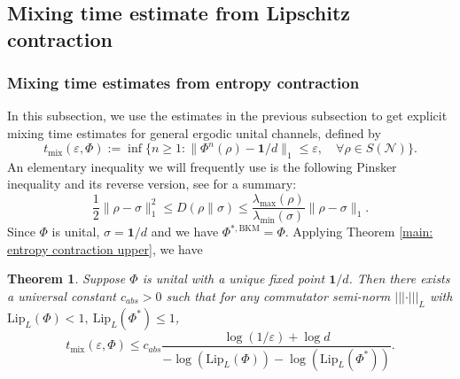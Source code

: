 \documentclass[11pt,reqno]{amsart}
\numberwithin{equation}{section}
\newtheorem{theorem}[lemma]{Theorem}
\newcommand{\mc}{\mathcal}
\newcommand{\Lip}{\mathrm{Lip}}
\begin{document}

\subsection{Mixing time estimate from Lipschitz contraction} \label{sec:mixing time estimate}
\subsubsection{Mixing time estimates from entropy contraction}
In this subsection, we use the estimates in the previous subsection to get explicit mixing time estimates for general ergodic unital channels, defined by 
\begin{equation}
    t_{\mathrm{mix}}(\varepsilon,\Phi):= \inf\{n\ge 1: \|\Phi^n(\rho) - \textbf{1}/d\|_1 \le \varepsilon,\quad \forall \rho \in S(\mc N)\}.
\end{equation}
An elementary inequality we will frequently use is the following Pinsker inequality and its reverse version, see \cite{vershynina2021quasi} for a summary:
\begin{equation}\label{Pinsker}
    \frac{1}{2}\|\rho - \sigma\|^2_1 \le D(\rho \| \sigma) \le \frac{\lambda_{\max}(\rho)}{\lambda_{\min}(\sigma)} \|\rho - \sigma\|_1.
\end{equation}
Since $\Phi$ is unital, $\sigma = \textbf{1}/d$ and we have $\Phi^{*,\mathrm{BKM}} = \Phi$. Applying Theorem \ref{main: entropy contraction upper}, we have 
\begin{theorem}\label{main: mixing time upper}
    Suppose $\Phi$ is unital with a unique fixed point $\textbf{1}/d$. Then there exists a universal constant $c_{abs}>0$ such that for any commutator semi-norm $|||\cdot|||_L$ with $\Lip_L(\Phi) < 1,\  \Lip_L(\Phi^*) \le  1$, 
    \begin{equation}
          t_{\mathrm{mix}}(\varepsilon,\Phi) \le c_{abs} \frac{\log(1/\varepsilon)+\log d }{-\log (\Lip_L(\Phi)) - \log( \Lip_L(\Phi^*))}.
    \end{equation}
\end{theorem}
\end{document}

